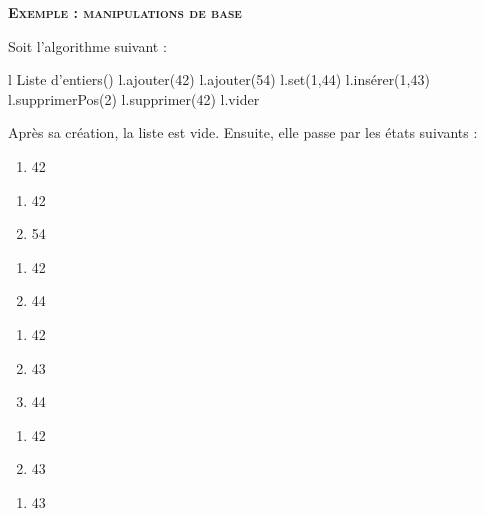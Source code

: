 \clearpage

		{\sffamily\bfseries\scshape
		Exemple : manipulations de base}
		
		Soit l'algorithme suivant :
		
		\begin{LDA}
				\Let l \Gets {} Liste d'entiers()
				\Stmt l.ajouter(42)
				\Stmt l.ajouter(54)
				\Stmt l.set(1,44)
				\Stmt l.insérer(1,43)
				\Stmt l.supprimerPos(2)
				\Stmt l.supprimer(42)
				\Stmt l.vider
			\EndAlgo
		\end{LDA}
		
		Après sa création, la liste est vide.
		Ensuite, elle passe par les états suivants :
		
		\begin{minipage}[t]{2cm}
		\begin{enumerate}[start=0]
		\item 42
		\end{enumerate}
		\end{minipage}
		\begin{minipage}[t]{2cm}
		\begin{enumerate}[start=0]
		\item 42
		\item 54
		\end{enumerate}
		\end{minipage}
		\begin{minipage}[t]{2cm}
		\begin{enumerate}[start=0]
		\item 42
		\item 44
		\end{enumerate}
		\end{minipage}
		\begin{minipage}[t]{2cm}
		\begin{enumerate}[start=0]
		\item 42
		\item 43
		\item 44
		\end{enumerate}
		\end{minipage}
		\begin{minipage}[t]{2cm}
		\begin{enumerate}[start=0]
		\item 42
		\item 43
		\end{enumerate}
		\end{minipage}
		\begin{minipage}[t]{2cm}
		\begin{enumerate}[start=0]
		\item 43
		\end{enumerate}
		\end{minipage}
		
